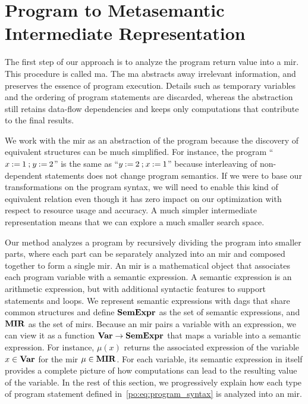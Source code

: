 \section{Program to Metasemantic Intermediate Representation}
\label{po:sec:program_to_mir}

The first step of our approach is to analyze the program return value into
a \gls{mir}\@.  This procedure is called \gls{ma}.  The \gls{ma} abstracts
away irrelevant information, and preserves the essence of program execution.
Details such as temporary variables and the ordering of program statements are
discarded, whereas the abstraction still retains data-flow dependencies and
keeps only computations that contribute to the final results.

We work with the \gls{mir} as an abstraction of the program because the
discovery of equivalent structures can be much simplified.  For instance, the
program ``$x \mathbin{:=} 1 \mathbin{;} y \mathbin{:=} 2$'' is the same as ``$y \mathbin{:=} 2
\mathbin{;} x \mathbin{:=} 1$'' because interleaving of non-dependent statements does
not change program semantics.  If we were to base our transformations on the
program syntax, we will need to enable this kind of equivalent relation even
though it has zero impact on our optimization with respect to resource usage
and accuracy.  A much simpler intermediate representation means that we can
explore a much smaller search space.

Our method analyzes a program by recursively dividing the program into smaller
parts, where each part can be separately analyzed into an \gls{mir} and
composed together to form a single \gls{mir}\@.  An \gls{mir} is a mathematical
object that associates each program variable with a semantic expression.  A
semantic expression is an arithmetic expression, but with additional syntactic
features to support \iflit{} statements and \whilelit{} loops.  We represent
semantic expressions with \glspl{dag} that share common structures and define
$\mathbf{SemExpr}$ as the set of semantic expressions, and $\mathbf{MIR}$ as the set of
\glspl{mir}.  Because an \gls{mir} pairs a variable with an expression, we
can view it as a function $\mathbf{Var} \to \mathbf{SemExpr}$ that maps a variable into a
semantic expression.  For instance, $\mu(x)$ returns the associated expression
of the variable $x \in \mathbf{Var}$ for the \gls{mir} $\mu \in \mathbf{MIR}$.  For each
variable, its semantic expression in itself provides a complete picture of how
computations can lead to the resulting value of the variable.  In the rest
of this section, we progressively explain how each type of program statement
defined in~\eqref{po:eq:program_syntax} is analyzed into an \gls{mir}\@.


